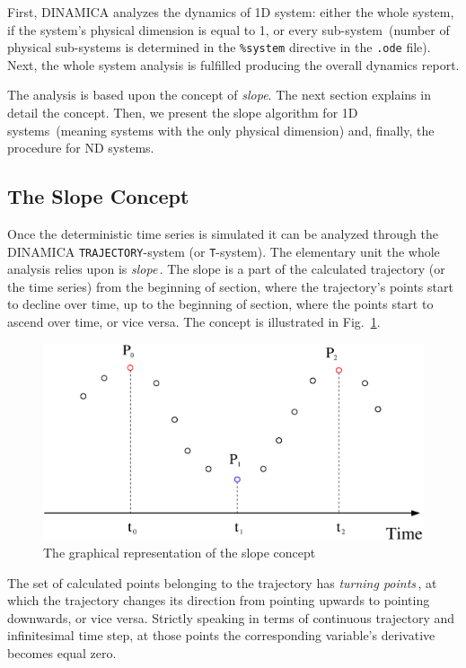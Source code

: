 \documentclass[11pt,a4paper]{article}
\begin{document}
First, DINAMICA analyzes the dynamics of 1D system: either the whole system, if the
system's physical dimension is equal to 1, or every sub-system~(number of physical
sub-systems is determined in the \texttt{\%system} directive in the \texttt{.ode}
file). Next, the whole system analysis is fulfilled producing the overall dynamics
report.

The analysis is based upon the concept of \textit{slope}. The next section
explains in detail the concept. Then, we present the slope algorithm for 1D
systems~(meaning systems with the only physical dimension) and, finally, the
procedure for ND systems.

\subsection{The Slope Concept}
\label{sec:concept-slope}

Once the deterministic time series is simulated it can be analyzed through the
DINAMICA \texttt{TRAJECTORY}-system (or \texttt{T}-system). The elementary unit the
whole analysis relies upon is \textit{slope}\,. The slope is a part of the calculated
trajectory (or the time series) from the beginning of section, where the trajectory's
points start to decline over time, up to the beginning of section, where the points
start to ascend over time, or vice versa. The concept is illustrated in
Fig.~\ref{fig:2}.

\begin{figure}[h]
  \centering
  \includegraphics[scale=0.55]{slope}
  \caption{The graphical representation of the slope concept}
  \label{fig:2}
\end{figure}

The set of calculated points belonging to the trajectory has \textit{turning
  points}\,, at which the trajectory changes its direction from pointing upwards to
pointing downwards, or vice versa. Strictly speaking in terms of continuous
trajectory and infinitesimal time step, at those points the corresponding variable's
derivative becomes equal zero.
\end{document}
